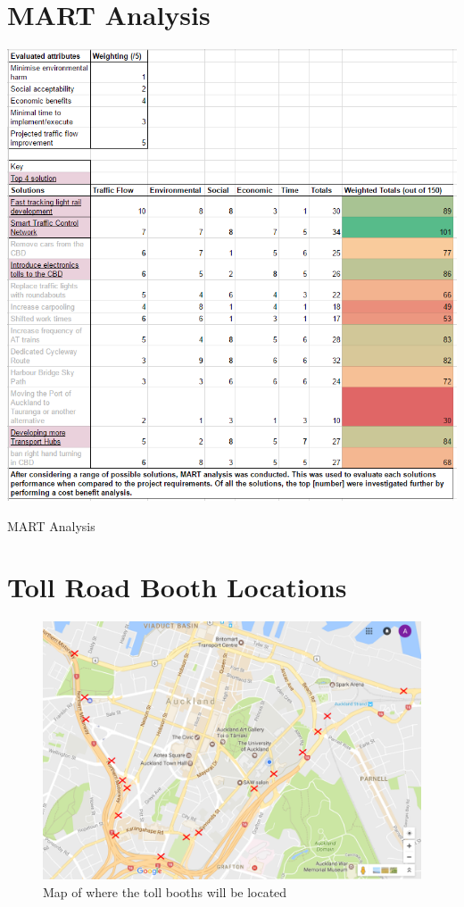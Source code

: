 \documentclass[twoside, a4paper, 11pt]{article}
\begin{document}
\section{MART Analysis}
\begin{table}[H]
\centering
\includegraphics[width=\textwidth]{MART_TABLE_2.PNG}
\caption{MART Analysis}
\label{mart}
\end{table}

\newpage
\section{Toll Road Booth Locations}
\begin{figure}[H]
\centering
\includegraphics[width=\textwidth]{MAP.png}
\caption{Map of where the toll booths will be located}
\label{fig:tollmap}
\end{figure}
\end{document}

